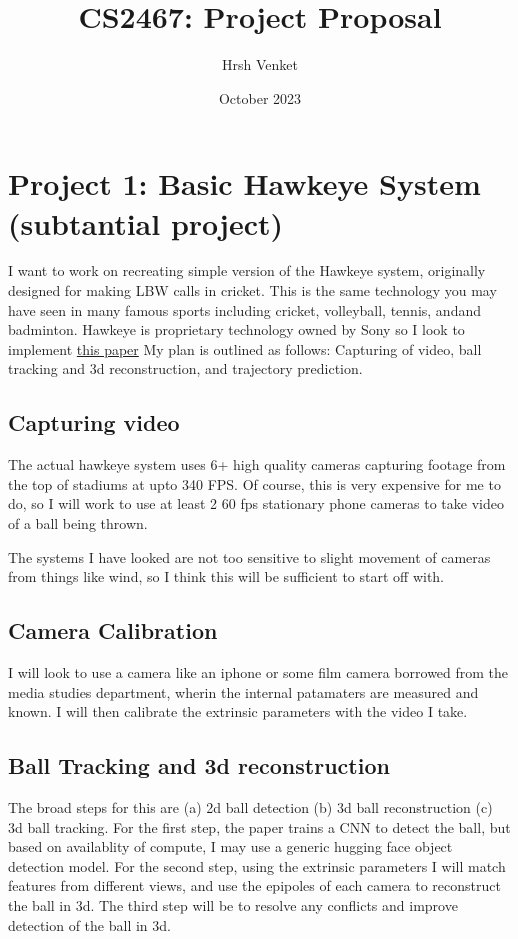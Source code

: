 \documentclass{article}
\title{CS2467: Project Proposal}
\author{Hrsh Venket}
\date{October 2023}
\begin{document}
\maketitle

\section{Project 1: Basic Hawkeye System (subtantial project)}

I want to work on recreating simple version of the Hawkeye system, originally designed for making LBW calls in cricket. This is the same technology you may have seen in many famous sports including cricket, volleyball, tennis, andand badminton. Hawkeye is proprietary technology owned by Sony so I look to implement \href{https://ietresearch.onlinelibrary.wiley.com/doi/full/10.1049/iet-ipr.2020.0757}{this paper}
My plan is outlined as follows: Capturing of video, ball tracking and 3d reconstruction, and trajectory prediction.

\subsection{Capturing video}

The actual hawkeye system uses 6+ high quality cameras capturing footage from the top of stadiums at upto 340 FPS. Of course, this is very expensive for me to do, so I will work to use at least 2 60 fps stationary phone cameras to take video of a ball being thrown. 

The systems I have looked are not too sensitive to slight movement of cameras from things like wind, so I think this will be sufficient to start off with.

\subsection{Camera Calibration}

I will look to use a camera like an iphone or some film camera borrowed from the media studies department, wherin the internal patamaters are measured and known. I will then calibrate the extrinsic parameters with the video I take.

\subsection{Ball Tracking and 3d reconstruction}

The broad steps for this are (a) 2d ball detection (b) 3d ball reconstruction (c) 3d ball tracking. For the first step, the paper trains a CNN to detect the ball, but based on availablity of compute, I may use a generic hugging face object detection model. For the second step, using the extrinsic parameters I will match features from different views, and use the epipoles of each camera to reconstruct the ball in 3d. The third step will be to resolve any conflicts and improve detection of the ball in 3d.
\end{document}
